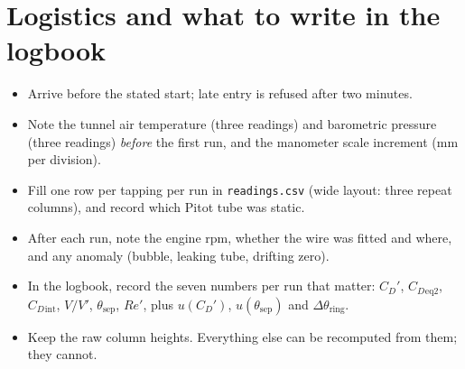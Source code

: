 \documentclass[11pt,a4paper]{article}
\newcommand{\CD}{\ensuremath{C_D}}
\newcommand{\ReD}{\ensuremath{\mathit{Re}}}
\newcommand{\thsep}{\ensuremath{\theta_{\text{sep}}}}
\begin{document}
\section{Logistics and what to write in the logbook}

\begin{itemize}[leftmargin=1.2em,itemsep=2pt,topsep=2pt]
\item Arrive before the stated start; late entry is refused after two minutes.
\item Note the tunnel air temperature (three readings) and barometric pressure (three readings)
\emph{before} the first run, and the manometer scale increment (mm per division).
\item Fill one row per tapping per run in \texttt{readings.csv} (wide layout: three repeat
columns), and record which Pitot tube was static.
\item After each run, note the engine rpm, whether the wire was fitted and where, and any
anomaly (bubble, leaking tube, drifting zero).
\item In the logbook, record the seven numbers per run that matter: $\CD'$,
$\CD{}_{\text{eq2}}$, $\CD{}_{\text{int}}$, $V/V'$, $\thsep$, $\ReD'$, plus
$u(\CD')$, $u(\thsep)$ and $\Delta\theta_{\text{ring}}$.
\item Keep the raw column heights. Everything else can be recomputed from them; they cannot.
\end{itemize}
\end{document}
